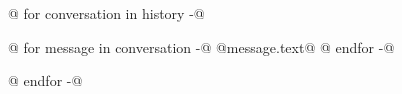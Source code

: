 \documentclass[a4paper]{article}
\begin{document}
@{ for conversation in history -}@
\begin{dialogue}
@{ for message in conversation -}@
 @{{message.text}}@
@{ endfor -}@
\end{dialogue}
@{ endfor -}@
\end{document}
